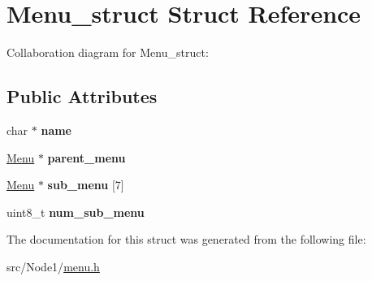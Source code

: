 \hypertarget{structMenu__struct}{}\section{Menu\+\_\+struct Struct Reference}
\label{structMenu__struct}


Collaboration diagram for Menu\+\_\+struct\+:
\subsection*{Public Attributes}
\begin{DoxyCompactItemize}
\item 
char $\ast$ {\bfseries name}\hypertarget{structMenu__struct_a3f91818488b8c8442afef89e88811c0a}{}\label{structMenu__struct_a3f91818488b8c8442afef89e88811c0a}

\item 
\hyperlink{structMenu__struct}{Menu} $\ast$ {\bfseries parent\+\_\+menu}\hypertarget{structMenu__struct_a7d3e8c8f8217c3bdddeff096afcd199d}{}\label{structMenu__struct_a7d3e8c8f8217c3bdddeff096afcd199d}

\item 
\hyperlink{structMenu__struct}{Menu} $\ast$ {\bfseries sub\+\_\+menu} \mbox{[}7\mbox{]}\hypertarget{structMenu__struct_a4e51aa07a7a978e69948ac99436e8581}{}\label{structMenu__struct_a4e51aa07a7a978e69948ac99436e8581}

\item 
uint8\+\_\+t {\bfseries num\+\_\+sub\+\_\+menu}\hypertarget{structMenu__struct_af5c31db8279e92d7fe5fdf22047c12aa}{}\label{structMenu__struct_af5c31db8279e92d7fe5fdf22047c12aa}

\end{DoxyCompactItemize}


The documentation for this struct was generated from the following file\+:\begin{DoxyCompactItemize}
\item 
src/\+Node1/\hyperlink{menu_8h}{menu.\+h}\end{DoxyCompactItemize}
